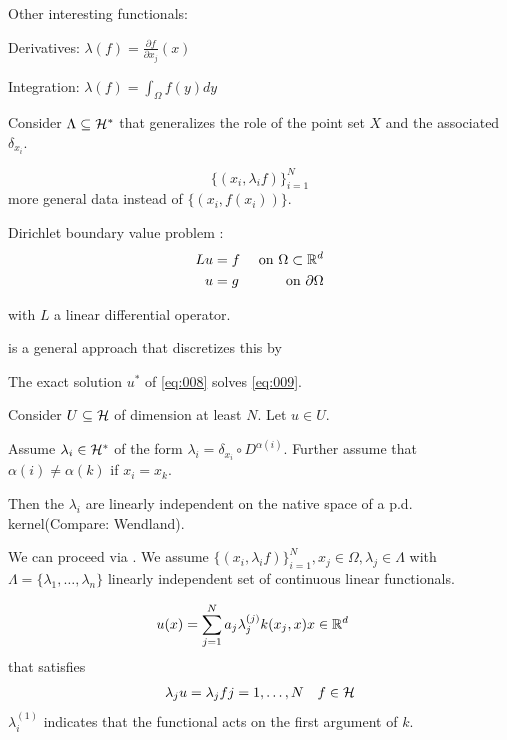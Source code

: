 
Other interesting functionals:

Derivatives: $\lambda(f)=\frac{\partial f }{\partial x_j}(x)$  %

Integration: $\lambda(f)=\int_\Omega f(y)dy$%

Consider $\Lambda\subseteq \mathcal{H}^*$ that generalizes the role of the point set $X$ and the associated $\delta_{x_i}$.

\[\{(x_i,\lambda_i f)\}_{i=1}^N\]
more general data instead of $\{(x_i,f(x_i))\}$.

Dirichlet boundary value problem :
\begin{eqnarray}\label{eq:008}
    Lu&=f&\text{ on }\Omega\subset \mathbb{R}^d\\
    u&=g&\text{ on }\partial \Omega\nonumber
\end{eqnarray}

with $L$ a linear differential operator.

 is a general approach that discretizes this by  

The exact solution $u^*$ of \ref{eq:008} solves \ref{eq:009}. 

Consider $U\subseteq \mathcal{H}$
of dimension at least $N$. Let $u\in U$.

Assume $\lambda_i\in\mathcal{H}^*$ of the form $\lambda_i=\delta_{x_i}\circ D^{\alpha(i)}$. 
Further assume that $\alpha(i)\neq\alpha(k)$ if $x_i=x_k$.

Then the $\lambda_i$ are linearly independent on the native space of a p.d. kernel(Compare: Wendland). 

We can proceed via . We assume $\{(x_i,\lambda_i f)\}_{i=1}^N,x_j\in\Omega,\lambda_j\in\Lambda$
with $\Lambda=\{\lambda_1,\dots,\lambda_n\}$ linearly independent set of continuous linear functionals.

\begin{eqnarray*}
    u(x)=\sum_{j=1}^N a_j \lambda_j^{(j)}k(x_j,x) & x\in\mathbb{R}^d
\end{eqnarray*}
that satisfies 
\begin{eqnarray*}
    \lambda_j u = \lambda_j f & j=1,\dots,N & f\in \cH %
\end{eqnarray*}
$\lambda_i^{(1)}$ indicates that the functional acts on the first argument of $k$.

